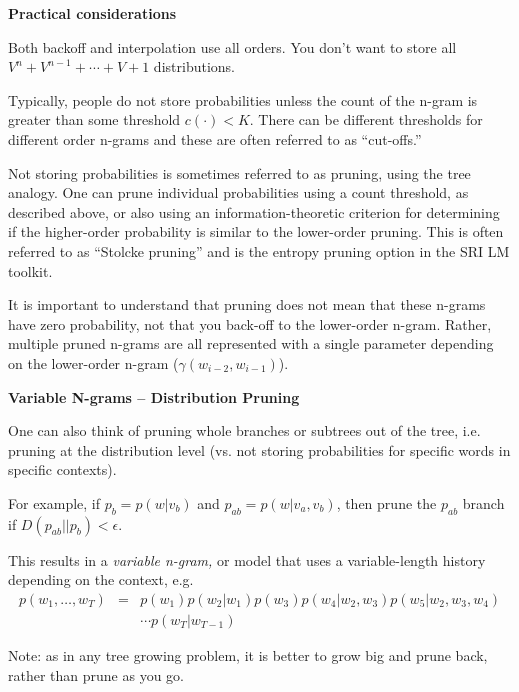 \documentclass[11pt,titlepage]{article}
\begin{document}
\vskip 0.2in

{\bf Practical considerations}

Both backoff and interpolation use all orders.  You don't want to store all
$V^n + V^{n-1} + \cdots + V + 1$ distributions.

Typically, people do not store probabilities unless the count of the
n-gram is greater than some threshold $c(\cdot)<K$.  There can be
different thresholds for different order n-grams and these are often
referred to as ``cut-offs.''

Not storing probabilities is sometimes referred to as pruning, using
the tree analogy.  One can prune individual probabilities using a
count threshold, as described above, or also using an
information-theoretic criterion for determining if the higher-order
probability is similar to the lower-order pruning.  This is often
referred to as ``Stolcke pruning'' and is the entropy pruning option in the
SRI LM toolkit.

It is important to understand that pruning does not mean that these n-grams have zero probability, not that you back-off to the lower-order n-gram. Rather, multiple pruned n-grams are all represented with a single parameter depending on the lower-order n-gram ($\gamma(w_{i-2},w_{i-1})$).

\clearpage


{\bf Variable N-grams -- Distribution Pruning}

One can also think of pruning whole branches or subtrees out of the tree,
i.e. pruning at the distribution level (vs. not storing probabilities for 
specific words in specific contexts).  

For example, if $p_b = p(w|v_b)$
and $p_{ab} = p(w|v_a,v_b)$, then prune the $p_{ab}$ branch if 
$D(p_{ab}||p_b)<\epsilon$.  

This results in a {\em variable n-gram,}
or model that uses a variable-length history depending on the context, e.g.
\begin{eqnarray*}
p(w_1,\ldots , w_T) & = & p(w_1)p(w_2|w_1)p(w_3)p(w_4|w_2,w_3)p(w_5|w_2,w_3,w_4)\\
 & & \cdots  p(w_T|w_{T-1})
\end{eqnarray*}

Note: as in any tree growing problem, it is better to grow big and prune back, rather than prune as you go.


\vskip -0.2in
\centerline{}
\vskip -0.1in
\end{document}
